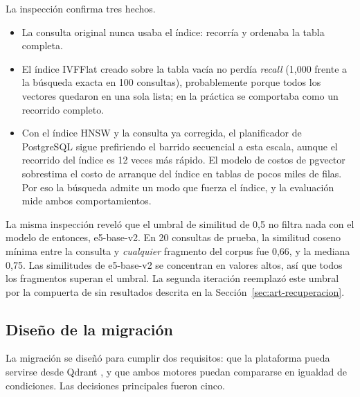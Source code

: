 La inspección confirma tres hechos.
\begin{itemize}
    \item La consulta original nunca usaba el índice: recorría y ordenaba la tabla completa.
    \item El índice IVFFlat creado sobre la tabla vacía no perdía \textit{recall} (1,000 frente a la búsqueda exacta en 100 consultas), probablemente porque todos los vectores quedaron en una sola lista; en la práctica se comportaba como un recorrido completo.
    \item Con el índice HNSW y la consulta ya corregida, el planificador de PostgreSQL sigue prefiriendo el barrido secuencial a esta escala, aunque el recorrido del índice es 12 veces más rápido. El modelo de costos de pgvector sobrestima el costo de arranque del índice en tablas de pocos miles de filas. Por eso la búsqueda admite un modo que fuerza el índice, y la evaluación mide ambos comportamientos.
\end{itemize}

La misma inspección reveló que el umbral de similitud de 0,5 no filtra nada con el modelo de entonces, e5-base-v2. En 20 consultas de prueba, la similitud coseno mínima entre la consulta y \emph{cualquier} fragmento del corpus fue 0,66, y la mediana 0,75. Las similitudes de e5-base-v2 se concentran en valores altos, así que todos los fragmentos superan el umbral. La segunda iteración reemplazó este umbral por la compuerta de sin resultados descrita en la Sección~\ref{sec:art-recuperacion}.

\subsection{Diseño de la migración}

La migración se diseñó para cumplir dos requisitos: que la plataforma pueda servirse desde Qdrant \citep{QdrantDocs}, y que ambos motores puedan compararse en igualdad de condiciones. Las decisiones principales fueron cinco.

